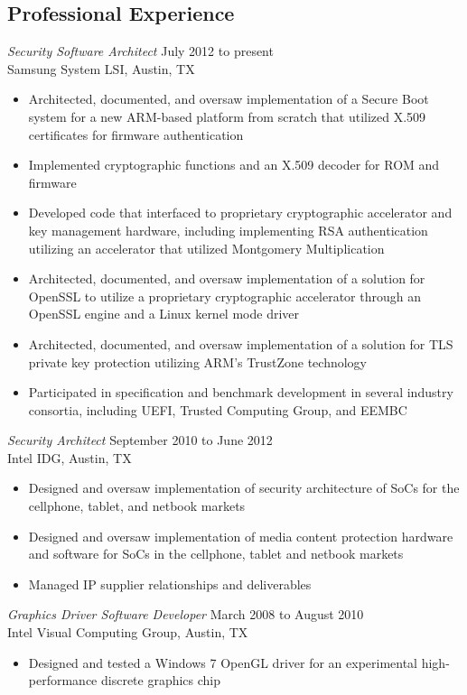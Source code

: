 \documentclass[margin]{res}
\begin{document}
\begin{resume}
\section{Professional Experience}
{\sl Security Software Architect} \hfill July 2012 to present \\
	Samsung System LSI, Austin, TX
\begin{itemize}
	\item Architected, documented, and oversaw implementation of a Secure Boot system for a new ARM-based platform from scratch that utilized X.509 certificates for firmware authentication
	\item Implemented cryptographic functions and an X.509 decoder for ROM and firmware
	\item Developed code that interfaced to proprietary cryptographic accelerator and key management hardware, including implementing RSA authentication utilizing an accelerator that utilized Montgomery Multiplication
	\item Architected, documented, and oversaw implementation of a solution for OpenSSL to utilize a proprietary cryptographic accelerator through an OpenSSL engine and a Linux kernel mode driver
	\item Architected, documented, and oversaw implementation of a solution for TLS private key protection utilizing ARM's TrustZone technology
	\item Participated in specification and benchmark development in several industry consortia, including UEFI, Trusted Computing Group, and EEMBC
\end{itemize}
{\sl Security Architect} \hfill September 2010 to June 2012 \\
	Intel IDG, Austin, TX
\begin{itemize}
	\item Designed and oversaw implementation of security architecture of SoCs for the cellphone, tablet, and netbook markets
	\item Designed and oversaw implementation of media content protection hardware and software for SoCs in the cellphone, tablet and netbook markets
	\item Managed IP supplier relationships and deliverables
\end{itemize}
{\sl Graphics Driver Software Developer} \hfill March 2008 to August 2010 \\
	Intel Visual Computing Group, Austin, TX
\begin{itemize}
	\item Designed and tested a Windows 7 OpenGL driver for an experimental high-performance discrete graphics chip

\end{itemize}
\end{resume}
\end{document}
